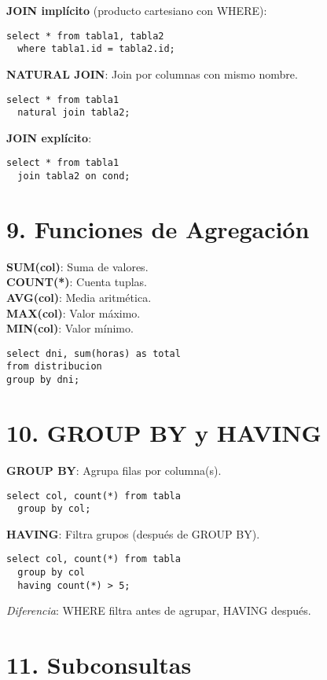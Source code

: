 \documentclass[10pt,a4paper,twocolumn]{article}
\begin{document}
\textbf{JOIN implícito} (producto cartesiano con WHERE):
\begin{lstlisting}
select * from tabla1, tabla2
  where tabla1.id = tabla2.id;
\end{lstlisting}

\textbf{NATURAL JOIN}: Join por columnas con mismo nombre.
\begin{lstlisting}
select * from tabla1 
  natural join tabla2;
\end{lstlisting}

\textbf{JOIN explícito}:
\begin{lstlisting}
select * from tabla1 
  join tabla2 on cond;
\end{lstlisting}

\section*{9. Funciones de Agregación}

\textbf{SUM(col)}: Suma de valores.\\
\textbf{COUNT(*)}: Cuenta tuplas.\\
\textbf{AVG(col)}: Media aritmética.\\
\textbf{MAX(col)}: Valor máximo.\\
\textbf{MIN(col)}: Valor mínimo.

\begin{lstlisting}
select dni, sum(horas) as total
from distribucion
group by dni;
\end{lstlisting}

\section*{10. GROUP BY y HAVING}

\textbf{GROUP BY}: Agrupa filas por columna(s).
\begin{lstlisting}
select col, count(*) from tabla
  group by col;
\end{lstlisting}

\textbf{HAVING}: Filtra grupos (después de GROUP BY).
\begin{lstlisting}
select col, count(*) from tabla
  group by col
  having count(*) > 5;
\end{lstlisting}

\textit{Diferencia}: WHERE filtra antes de agrupar, HAVING después.

\section*{11. Subconsultas}
\end{document}
